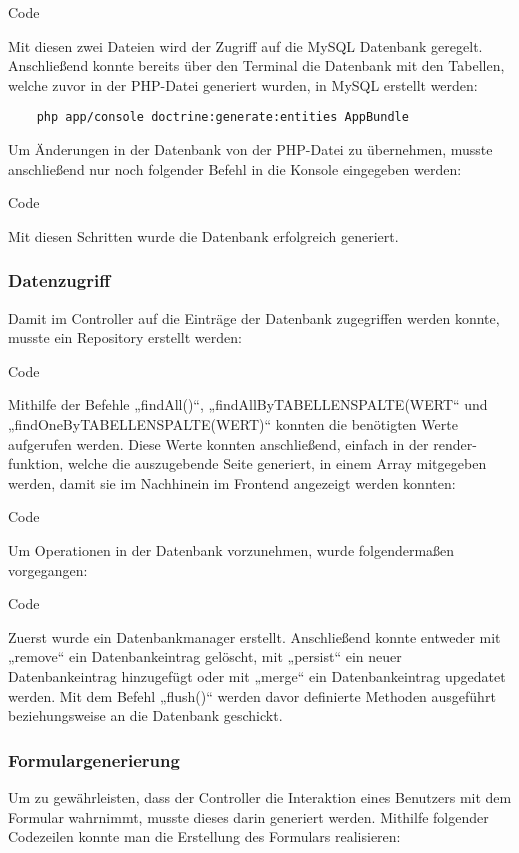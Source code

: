 	Code
	
	Mit diesen zwei Dateien wird der Zugriff auf die MySQL Datenbank geregelt.
	Anschließend konnte bereits über den Terminal die Datenbank mit den Tabellen, welche zuvor in der PHP-Datei generiert wurden, in MySQL erstellt werden:
	\lstset{language = bash}
  	\begin{lstlisting}
	php app/console doctrine:generate:entities AppBundle
  	\end{lstlisting}
	Um Änderungen in der Datenbank von der PHP-Datei zu übernehmen, musste anschließend nur noch folgender Befehl in die Konsole eingegeben werden:
	
	Code
	
	Mit diesen Schritten wurde die Datenbank erfolgreich generiert.

    \subsubsection{Datenzugriff}

	Damit im Controller auf die Einträge der Datenbank zugegriffen werden konnte, musste ein Repository erstellt werden:
	
	Code
	
	Mithilfe der Befehle „findAll()“, „findAllByTABELLENSPALTE(WERT“ und „findOneByTABELLENSPALTE(WERT)“ konnten die benötigten Werte aufgerufen werden.
	Diese Werte konnten anschließend, einfach in der render-funktion, welche die auszugebende Seite generiert, in einem Array mitgegeben werden, damit sie im Nachhinein im Frontend angezeigt werden konnten:
	
	Code
	
	Um Operationen in der Datenbank vorzunehmen, wurde folgendermaßen vorgegangen:
	
	Code
	
	Zuerst wurde ein Datenbankmanager erstellt. Anschließend konnte entweder mit „remove“ ein Datenbankeintrag gelöscht, mit „persist“ ein neuer Datenbankeintrag hinzugefügt oder mit „merge“ ein Datenbankeintrag upgedatet werden. Mit dem Befehl „flush()“ werden davor definierte Methoden ausgeführt beziehungsweise an die Datenbank geschickt.

    \subsubsection{Formulargenerierung}

	Um zu gewährleisten, dass der Controller die Interaktion eines Benutzers mit dem Formular wahrnimmt, musste dieses darin generiert werden. Mithilfe folgender Codezeilen konnte man die Erstellung des Formulars realisieren:
	
